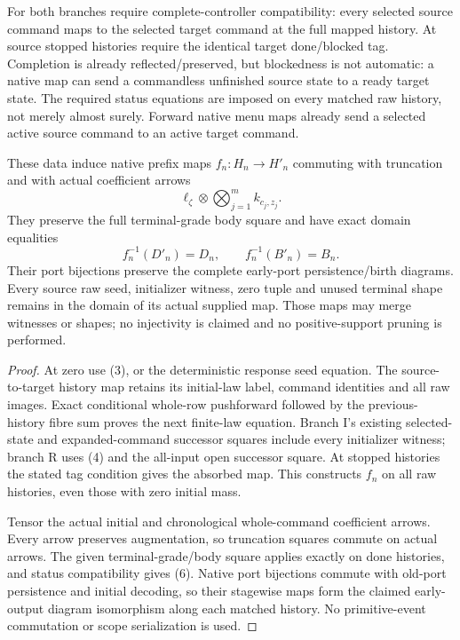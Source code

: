 \documentclass[11pt]{article}
\begin{document}
For both branches require complete-controller compatibility: every selected source command maps to the selected target command at the full mapped history. At source stopped histories require the identical target done/blocked tag. Completion is already reflected/preserved, but blockedness is not automatic: a native map can send a commandless unfinished source state to a ready target state. The required status equations are imposed on every matched raw history, not merely almost surely. Forward native menu maps already send a selected active source command to an active target command.

\begin{theorem}
These data induce native prefix maps $f_n:H_n\to H'_n$ commuting with truncation and with actual coefficient arrows
\[
            \ell_\zeta\otimes\bigotimes_{j=1}^m k_{c_j,z_j}. \tag{5}
\]
They preserve the full terminal-grade body square and have exact domain equalities
\[
             f_n^{-1}(D'_n)=D_n,\qquad f_n^{-1}(B'_n)=B_n. \tag{6}
\]
Their port bijections preserve the complete early-port persistence/birth diagrams. Every source raw seed, initializer witness, zero tuple and unused terminal shape remains in the domain of its actual supplied map. Those maps may merge witnesses or shapes; no injectivity is claimed and no positive-support pruning is performed.
\end{theorem}
\begin{proof}
At zero use (3), or the deterministic response seed equation. The source-to-target history map retains its initial-law label, command identities and all raw images. Exact conditional whole-row pushforward followed by the previous-history fibre sum proves the next finite-law equation. Branch I's existing selected-state and expanded-command successor squares include every initializer witness; branch R uses (4) and the all-input open successor square. At stopped histories the stated tag condition gives the absorbed map. This constructs $f_n$ on all raw histories, even those with zero initial mass.

Tensor the actual initial and chronological whole-command coefficient arrows. Every arrow preserves augmentation, so truncation squares commute on actual arrows. The given terminal-grade/body square applies exactly on done histories, and status compatibility gives (6). Native port bijections commute with old-port persistence and initial decoding, so their stagewise maps form the claimed early-output diagram isomorphism along each matched history. No primitive-event commutation or scope serialization is used.\end{proof}
\end{document}
